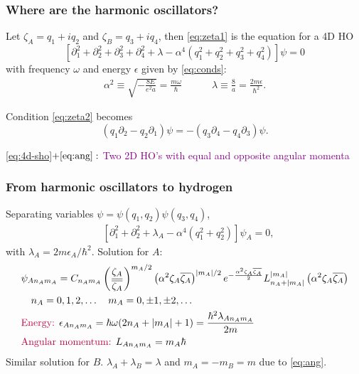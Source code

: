 \documentclass{beamer}
\theoremstyle{definition}
\newcommand{\lp}{\left(}
\newcommand{\rp}{\right)}
\newcommand{\p}{\partial}
\newcommand{\f}[2]{\frac{#1}{#2}}
\newcommand{\al}{\alpha}
\begin{document}
\begin{frame}
	\frametitle{Where are the harmonic oscillators?}
	
	Let $\zeta_A = q_1 + iq_2$ and $\zeta_B = q_3 + iq_4$, then \eqref{eq:zeta1} is the equation for a 4D HO
	\begin{equation}\label{eq:4d-sho}
	[\p_1^2 + \p_2^2 + \p_3^2 + \p_4^2 + \lambda - \al^4(q_1^2 + q_2^2 + q_3^2 + q_4^2)] \psi = 0
	\end{equation}
	\pause
	with frequency $\omega$ and energy $\epsilon$ given by \eqref{eq:conds}:
	\begin{align*}
	\al^2 \equiv \sqrt{-\f{8E}{e^2 a}} = \f{m \omega}{\hbar} 
	\quad\quad\quad 
	\lambda \equiv \f{8}{a} = \f{2m \epsilon}{\hbar^2}.
	\end{align*}
	
	\pause 
	Condition \eqref{eq:zeta2} becomes
	\begin{equation}
	\label{eq:ang}
	(q_1 \p_2 - q_2 \p_1) \psi = -(q_3 \p_4 - q_4 \p_3)\psi.
	\end{equation}
	
	\eqref{eq:4d-sho}$ + \eqref{eq:ang}:$ 
	\textcolor{purple}{Two 2D HO's with equal and opposite angular momenta}
\end{frame}




\begin{frame}
	\frametitle{From harmonic oscillators to hydrogen}
	
	Separating variables $\psi = \psi(q_1, q_2) \psi(q_3, q_4)$, 
	\begin{align*}
	&[\p_1^2 + \p_2^2 + \lambda_A - \al^4(q_1^2 + q_2^2)]\psi_A = 0,
	\end{align*}
	with $\lambda_A = 2 m \epsilon_A / \hbar^2$.  \pause Solution for $A$: 
	\begin{align*}
	&\psi_{A n_A m_A}  = C_{n_Am_A} \lp \f{\zeta_A }{\overline{\zeta_A}} \rp^{{m_A}/2}  
	\lp\al^2 \zeta_A \overline{\zeta_A}\rp^{\abs{m_A}/2}e^{ -\f{\al^2 \zeta_A \overline{\zeta_A}}{2} } 
	L_{n_A + \abs{m_A}}^{\abs{m_A}} \lp \al^2 \zeta_A \overline{\zeta_A} \rp\\
	&\quad n_A = 0,1,2,\dots \quad 
	m_A = 0, \pm 1, \pm 2, \dots  \\ 
	&\text{\textcolor{purple}{Energy: }} \epsilon_{A n_A m_A} = \hbar \omega(2n_A + \abs{m_A} + 1) = \f{\hbar^2 \lambda_{An_A m_A}}{2m}\\
	&\text{\textcolor{purple}{Angular momentum: }} L_{A n_A m_A} = m_A \hbar 
	\end{align*}
	Similar solution for $B$. $\lambda_A + \lambda_B = \lambda$ and $m_A = -m_B = m$ due to \eqref{eq:ang}.
\end{frame}
\end{document}
